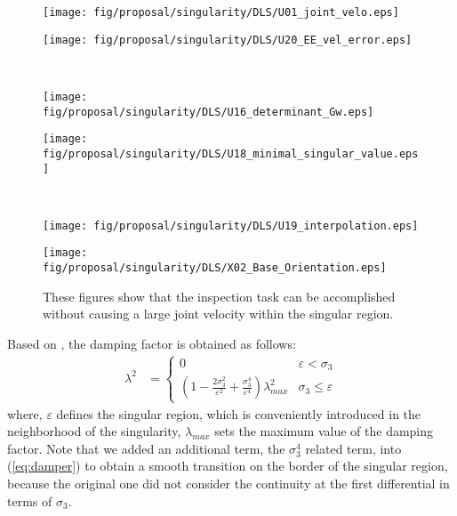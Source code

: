 \documentclass[preprint,12pt]{elsarticle}
\def\eq#1{{(\ref{eq:#1})}}
\begin{document}
%
\begin{figure}[t]
  \centering
  \begin{minipage}[h]{0.40\linewidth}
    \centering
    \texttt{[image: fig/proposal/singularity/DLS/U01\_joint\_velo.eps]}
  \end{minipage}
  \begin{minipage}[h]{0.40\linewidth}
    \centering
    \texttt{[image: fig/proposal/singularity/DLS/U20\_EE\_vel\_error.eps]}
  \end{minipage}\\
  \vspace{-7mm}
  \begin{minipage}[h]{0.40\linewidth}
    \centering
    \texttt{[image: fig/proposal/singularity/DLS/U16\_determinant\_Gw.eps]}
  \end{minipage}
  \begin{minipage}[h]{0.40\linewidth}
    \centering
    \texttt{[image: fig/proposal/singularity/DLS/U18\_minimal\_singular\_value.eps]}
  \end{minipage}\\
  \vspace{-7mm}
  \begin{minipage}[h]{0.40\linewidth}
    \centering
    \texttt{[image: fig/proposal/singularity/DLS/U19\_interpolation.eps]}
  \end{minipage}
  \begin{minipage}[h]{0.40\linewidth}
    \centering
    \texttt{[image: fig/proposal/singularity/DLS/X02\_Base\_Orientation.eps]}
  \end{minipage}
  \caption{These figures show that the inspection task can be accomplished without causing a large joint velocity
    within the singular region.}
  \label{fig:RES_DLS}
\end{figure}
%
Based on \cite{Chiaverini1994},
the damping factor is obtained as follows:
%
\begin{align}
   \lambda^{2} &= \begin{cases} 0 & \varepsilon < \sigma_{3} \\
    (1 - \frac{2\sigma^{2}_{3}}{\varepsilon^{2}} + \frac{\sigma_{3}^{4}}{\varepsilon^{4}})\lambda_{max}^{2}
   & \sigma_{3} \leq \varepsilon\label{eq:damper}
  \end{cases}
\end{align}
%
where, $\varepsilon$ defines the singular region,
which is conveniently introduced in the neighborhood of the singularity,
$\lambda_{max}$ sets the maximum value of the damping factor.
Note that we added an additional term, the $\sigma_{3}^{4}$ related term, into \eq{damper} to obtain a smooth transition on the border of the singular region,
because the original one did not consider the continuity at the first differential in terms of $\sigma_{3}$.
\end{document}
